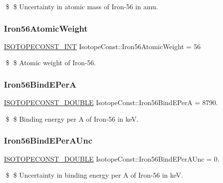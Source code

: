 \$ \$ Uncertainty in atomic mass of Iron-\/56 in amu. \mbox{\label{group___isotope_const-_iron-_fe56_ga32c0811c6d327f3f265fd0c21d3681b8}} 
\subsubsection{\texorpdfstring{Iron56\+Atomic\+Weight}{Iron56AtomicWeight}}
{\footnotesize\ttfamily \mbox{\hyperlink{group___isotope_const-_macros_ga5f18360b3e99483a35c32d789e62621c}{I\+S\+O\+T\+O\+P\+E\+C\+O\+N\+S\+T\+\_\+\+I\+NT}} Isotope\+Const\+::\+Iron56\+Atomic\+Weight = 56}

\$ \$ Atomic weight of Iron-\/56. \mbox{\label{group___isotope_const-_iron-_fe56_ga36c5782affff5abf06fae16914558db2}} 
\subsubsection{\texorpdfstring{Iron56\+Bind\+E\+PerA}{Iron56BindEPerA}}
{\footnotesize\ttfamily \mbox{\hyperlink{group___isotope_const-_macros_ga8f45a7272ce02c0b4c65c44636ed719a}{I\+S\+O\+T\+O\+P\+E\+C\+O\+N\+S\+T\+\_\+\+D\+O\+U\+B\+LE}} Isotope\+Const\+::\+Iron56\+Bind\+E\+PerA = 8790.}

\$ \$ Binding energy per A of Iron-\/56 in keV. \mbox{\label{group___isotope_const-_iron-_fe56_gaa6de764bfa73cad3238dec0585b3eba9}} 
\subsubsection{\texorpdfstring{Iron56\+Bind\+E\+Per\+A\+Unc}{Iron56BindEPerAUnc}}
{\footnotesize\ttfamily \mbox{\hyperlink{group___isotope_const-_macros_ga8f45a7272ce02c0b4c65c44636ed719a}{I\+S\+O\+T\+O\+P\+E\+C\+O\+N\+S\+T\+\_\+\+D\+O\+U\+B\+LE}} Isotope\+Const\+::\+Iron56\+Bind\+E\+Per\+A\+Unc = 0.}

\$ \$ Uncertainty in binding energy per A of Iron-\/56 in keV. \mbox{\label{group___isotope_const-_iron-_fe56_ga814e172cea9ef71be91485ae65c0a0da}} 
